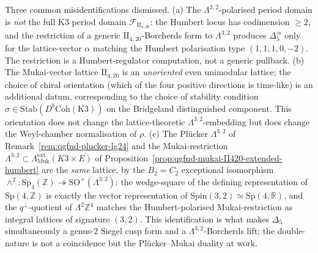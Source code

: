 \begin{remark}
Three common misidentifications dismissed. (a) The
$\Lambda^{3,2}$-polarised period domain is \emph{not} the full K$3$
period domain $\mathcal F_{\mathrm{II}_{4,20}}$: the Humbert locus
has codimension $\geq 2$, and the restriction of a generic
$\mathrm{II}_{4,20}$-Borcherds form to $\Lambda^{3,2}$ produces
$\Delta_5^{\,\alpha}$ only for the lattice-vector $\alpha$ matching
the Humbert polarisation type $(1,1,1,0,-2)$. The restriction is a
Humbert-regulator computation, not a generic pullback. (b) The
Mukai-vector lattice $\mathrm{II}_{4,20}$ is an
\emph{unoriented} even unimodular lattice; the choice of chiral
orientation (which of the four positive directions is time-like)
is an additional datum, corresponding to the choice of stability
condition $\sigma\in\mathrm{Stab}(D^b\mathrm{Coh}(\mathrm{K3}))$
on the Bridgeland distinguished component. This orientation does
not change the lattice-theoretic $\Lambda^{3,2}$-embedding but does
change the Weyl-chamber normalisation of $\rho$. (c) The
Pl\"ucker $\Lambda^{3,2}$ of Remark~\ref{rem:qgfnd-plucker-lg24} and
the Mukai-restriction $\Lambda^{3,2}\subset\Lambda_{\mathrm{Muk}}^{\mathrm{ext}}(K3\times E)$
of Proposition~\ref{prop:qgfnd-mukai-II420-extended-humbert} are the
\emph{same} lattice, by the $B_2=C_2$ exceptional isomorphism
$\wedge^2\colon\mathrm{Sp}_4(\mathbb Z)\twoheadrightarrow\mathrm{SO}^+(\Lambda^{3,2})$:
the wedge-square of the defining representation of
$\mathrm{Sp}(4,\mathbb Z)$ is exactly the vector representation of
$\mathrm{Spin}(3,2)\simeq\mathrm{Sp}(4,\mathbb R)$, and the
$q^{\perp}$-quotient of $\Lambda^2\mathbb Z^4$ matches the
Humbert-polarised Mukai-restriction as integral lattices of
signature $(3,2)$. This identification is what makes $\Delta_5$
simultaneously a genus-$2$ Siegel cusp form and a
$\Lambda^{3,2}$-Borcherds lift; the double-nature is not a
coincidence but the Pl\"ucker--Mukai duality at work.
\end{remark}

